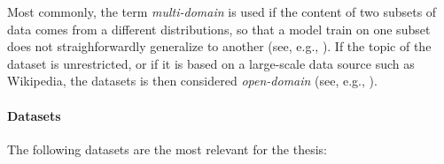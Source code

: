 Most commonly, the term \emph{multi-domain} is used if the content of two subsets of data comes from a different distributions, so that a model train on one subset does not straighforwardly generalize to another (see, e.g., \citealp{vanderleeCACAPODatasetMultilingual2020,budzianowskiMultiWOZLargeScaleMultiDomain2020,rastogiScalableMultiDomainConversational2020}). If the topic of the dataset is unrestricted, or if it is based on a large-scale data source such as Wikipedia, the datasets is then considered \emph{open-domain} (see, e.g., \citealp{chenLogicalNaturalLanguage2020,nan2021dart,kann2022open}).

\paragraph{Datasets} The following datasets are the most relevant for the thesis:

